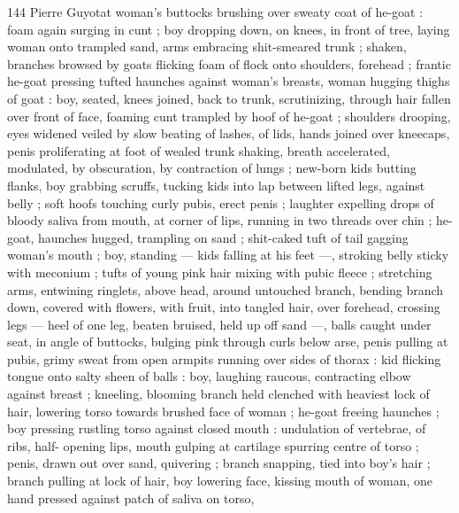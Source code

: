 144 Pierre Guyotat
woman's buttocks brushing over sweaty coat of he-goat : foam again
surging in cunt ; boy dropping down, on knees, in front of tree,
laying woman onto trampled sand, arms embracing shit-smeared
trunk ; shaken, branches browsed by goats flicking foam of flock
onto shoulders, forehead ; frantic he-goat pressing tufted haunches
against woman's breasts, woman hugging thighs of goat : boy,
seated, knees joined, back to trunk, scrutinizing, through hair fallen
over front of face, foaming cunt trampled by hoof of he-goat ;
shoulders drooping, eyes widened veiled by slow beating of lashes,
of lids, hands joined over kneecaps, penis proliferating at foot of
wealed trunk shaking, breath accelerated, modulated, by
obscuration, by contraction of lungs ; new-born kids butting flanks,
boy grabbing scruffs, tucking kids into lap between lifted legs,
against belly ; soft hoofs touching curly pubis, erect penis ; laughter
expelling drops of bloody saliva from mouth, at corner of lips,
running in two threads over chin ; he-goat, haunches hugged,
trampling on sand ; shit-caked tuft of tail gagging woman's mouth ;
boy, standing — kids falling at his feet —, stroking belly sticky with
meconium ; tufts of young pink hair mixing with pubic fleece ;
stretching arms, entwining ringlets, above head, around untouched
branch, bending branch down, covered with flowers, with fruit, into
tangled hair, over forehead, crossing legs — heel of one leg, beaten
bruised, held up off sand —, balls caught under seat, in angle of
buttocks, bulging pink through curls below arse, penis pulling at
pubis, grimy sweat from open armpits running over sides of thorax :
kid flicking tongue onto salty sheen of balls : boy, laughing raucous,
contracting elbow against breast ; kneeling, blooming branch held
clenched with heaviest lock of hair, lowering torso towards brushed
face of woman ; he-goat freeing haunches ; boy pressing rustling
torso against closed mouth : undulation of vertebrae, of ribs, half-
opening lips, mouth gulping at cartilage spurring centre of torso ;
penis, drawn out over sand, quivering ; branch snapping, tied into
boy’s hair ; branch pulling at lock of hair, boy lowering face, kissing
mouth of woman, one hand pressed against patch of saliva on torso,

